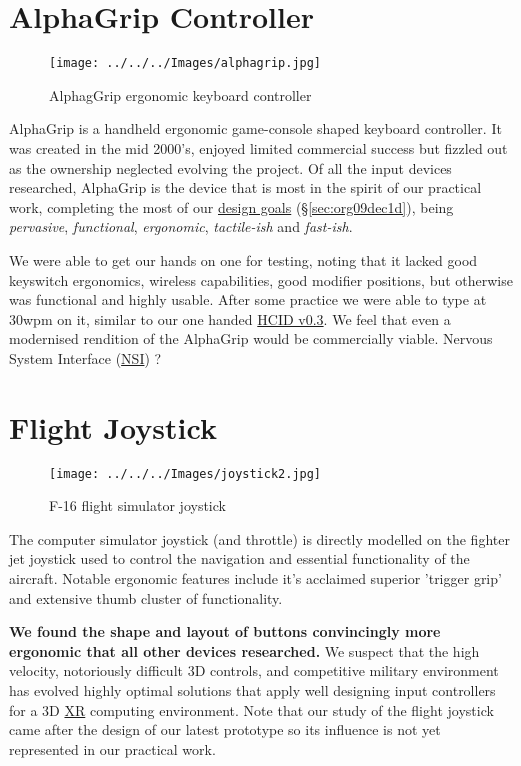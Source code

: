 \documentclass[logo,bsc,singlespacing,parskip]{infthesis}
\begin{document}
\chapter{AlphaGrip Controller}
\label{sec:org23a7c76}
\begin{figure}[h]
\centering
\texttt{[image: ../../../Images/alphagrip.jpg]}
\caption{AlphagGrip ergonomic keyboard controller}
\end{figure}

AlphaGrip is a handheld ergonomic game-console shaped keyboard controller.
It was created in the mid 2000's, enjoyed limited commercial success but fizzled out as the ownership neglected evolving the project.
Of all the input devices researched, AlphaGrip is the device that is most in the spirit of our practical work, completing the most of our \hyperref[sec:org09dec1d]{design goals} (\S \ref{sec:org09dec1d}), being \emph{pervasive}, \emph{functional}, \emph{ergonomic}, \emph{tactile-ish} and \emph{fast-ish}.

We were able to get our hands on one for testing, noting that it lacked good keyswitch ergonomics, wireless capabilities, good modifier positions, but otherwise was functional and highly usable.
After some practice we were able to type at 30wpm on it, similar to our one handed \hyperref[sec:org208909f]{HCID v0.3}.
We feel that even a modernised rendition of the AlphaGrip would be commercially viable.
Nervous System Interface (\hyperref[org5662848]{NSI}) ?
\chapter{Flight Joystick}
\label{sec:orga22be8e}
\begin{figure}[h]
\centering
\texttt{[image: ../../../Images/joystick2.jpg]}
\caption{F-16 flight simulator joystick}
\end{figure}

The computer simulator joystick (and throttle) is directly modelled on the fighter jet joystick used to control the navigation and essential functionality of the aircraft.
Notable ergonomic features include it's acclaimed superior 'trigger grip' and extensive thumb cluster of functionality.

\textbf{We found the shape and  layout of buttons convincingly more ergonomic that all other devices researched.}
We suspect that the high velocity, notoriously difficult 3D controls, and competitive military environment has evolved highly optimal solutions that apply well designing input controllers for a 3D \hyperref[orgf7f8e78]{XR} computing environment.
Note that our study of the flight joystick came after the design of our latest prototype so its influence is not yet represented in our practical work.
\end{document}
